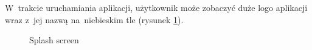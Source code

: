 \documentclass[a4paper,twoside,titlepage,openright]{book}
\begin{document}
W~trakcie uruchamiania aplikacji, użytkownik może zobaczyć duże logo aplikacji wraz z~jej nazwą na~niebieskim tle (rysunek \ref{fig:splashScreen}).

\begin{figure}[h!]
	\centering
	\begin{minipage}[t]{0.3\textwidth}
		\setlength{\fboxsep}{1pt}
		\caption{Splash screen}
		\label{fig:splashScreen}
	\end{minipage}
	\hfill
	\begin{minipage}[t]{0.3\textwidth}

\end{minipage}
\end{figure}
\end{document}

